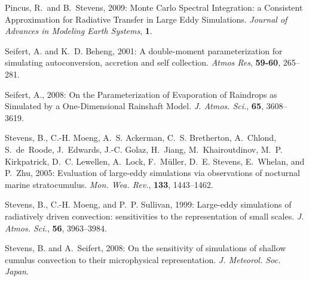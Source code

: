 \documentclass[11pt,a4paper]{article}
\begin{document}
\begin{thebibliography}{8}
Pincus, R.\ and B.\ Stevens, 2009: Monte Carlo Spectral Integration: a Consistent Approximation for Radiative Transfer in Large Eddy Simulations. {\it Journal of Advances in Modeling Earth Systems\/},
  {\bf 1}.

Seifert, A. and K.~D. Beheng, 2001: A double-moment parameterization for
  simulating autoconversion, accretion and self collection. {\it Atmos Res\/},
  {\bf 59-60}, 265--281.

Seifert, A., 2008: On the Parameterization of Evaporation of Raindrops as
Simulated by a One-Dimensional Rainshaft Model. {\it J. Atmos. Sci.\/},
  {\bf 65}, 3608--3619.

Stevens, B., C.-H. Moeng, A.~S. Ackerman, C.~S. Bretherton, A.~Chlond,
  S.~de~Roode, J.~Edwards, J.-C. Golaz, H.~Jiang, M.~Khairoutdinov, M.~P.
  Kirkpatrick, D.~C. Lewellen, A.~Lock, F.~M\"uller, D.~E. Stevens, E.~Whelan,
  and P.~Zhu, 2005: Evaluation of large-eddy simulations via observations of
  nocturnal marine stratocumulus. {\it Mon. Wea. Rev.\/}, {\bf 133},
  1443--1462.

Stevens, B., C.-H. Moeng, and P.~P. Sullivan, 1999: Large-eddy simulations of
  radiatively driven convection: sensitivities to the representation of small
  scales. {\it J. Atmos. Sci.\/}, {\bf 56}, 3963--3984.

Stevens, B. and A.~Seifert, 2008: On the sensitivity of simulations of shallow
  cumulus convection to their microphysical representation. {\it J. Meteorol.
  Soc. Japan\/}.

\end{thebibliography}
\end{document}
